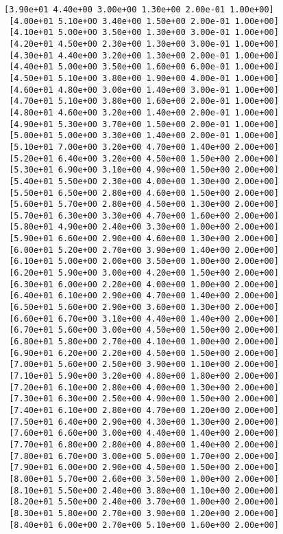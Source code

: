 \documentclass[11pt]{article}
\begin{document}
\begin{Verbatim}[commandchars=\\\{\}]
 [3.90e+01 4.40e+00 3.00e+00 1.30e+00 2.00e-01 1.00e+00]
 [4.00e+01 5.10e+00 3.40e+00 1.50e+00 2.00e-01 1.00e+00]
 [4.10e+01 5.00e+00 3.50e+00 1.30e+00 3.00e-01 1.00e+00]
 [4.20e+01 4.50e+00 2.30e+00 1.30e+00 3.00e-01 1.00e+00]
 [4.30e+01 4.40e+00 3.20e+00 1.30e+00 2.00e-01 1.00e+00]
 [4.40e+01 5.00e+00 3.50e+00 1.60e+00 6.00e-01 1.00e+00]
 [4.50e+01 5.10e+00 3.80e+00 1.90e+00 4.00e-01 1.00e+00]
 [4.60e+01 4.80e+00 3.00e+00 1.40e+00 3.00e-01 1.00e+00]
 [4.70e+01 5.10e+00 3.80e+00 1.60e+00 2.00e-01 1.00e+00]
 [4.80e+01 4.60e+00 3.20e+00 1.40e+00 2.00e-01 1.00e+00]
 [4.90e+01 5.30e+00 3.70e+00 1.50e+00 2.00e-01 1.00e+00]
 [5.00e+01 5.00e+00 3.30e+00 1.40e+00 2.00e-01 1.00e+00]
 [5.10e+01 7.00e+00 3.20e+00 4.70e+00 1.40e+00 2.00e+00]
 [5.20e+01 6.40e+00 3.20e+00 4.50e+00 1.50e+00 2.00e+00]
 [5.30e+01 6.90e+00 3.10e+00 4.90e+00 1.50e+00 2.00e+00]
 [5.40e+01 5.50e+00 2.30e+00 4.00e+00 1.30e+00 2.00e+00]
 [5.50e+01 6.50e+00 2.80e+00 4.60e+00 1.50e+00 2.00e+00]
 [5.60e+01 5.70e+00 2.80e+00 4.50e+00 1.30e+00 2.00e+00]
 [5.70e+01 6.30e+00 3.30e+00 4.70e+00 1.60e+00 2.00e+00]
 [5.80e+01 4.90e+00 2.40e+00 3.30e+00 1.00e+00 2.00e+00]
 [5.90e+01 6.60e+00 2.90e+00 4.60e+00 1.30e+00 2.00e+00]
 [6.00e+01 5.20e+00 2.70e+00 3.90e+00 1.40e+00 2.00e+00]
 [6.10e+01 5.00e+00 2.00e+00 3.50e+00 1.00e+00 2.00e+00]
 [6.20e+01 5.90e+00 3.00e+00 4.20e+00 1.50e+00 2.00e+00]
 [6.30e+01 6.00e+00 2.20e+00 4.00e+00 1.00e+00 2.00e+00]
 [6.40e+01 6.10e+00 2.90e+00 4.70e+00 1.40e+00 2.00e+00]
 [6.50e+01 5.60e+00 2.90e+00 3.60e+00 1.30e+00 2.00e+00]
 [6.60e+01 6.70e+00 3.10e+00 4.40e+00 1.40e+00 2.00e+00]
 [6.70e+01 5.60e+00 3.00e+00 4.50e+00 1.50e+00 2.00e+00]
 [6.80e+01 5.80e+00 2.70e+00 4.10e+00 1.00e+00 2.00e+00]
 [6.90e+01 6.20e+00 2.20e+00 4.50e+00 1.50e+00 2.00e+00]
 [7.00e+01 5.60e+00 2.50e+00 3.90e+00 1.10e+00 2.00e+00]
 [7.10e+01 5.90e+00 3.20e+00 4.80e+00 1.80e+00 2.00e+00]
 [7.20e+01 6.10e+00 2.80e+00 4.00e+00 1.30e+00 2.00e+00]
 [7.30e+01 6.30e+00 2.50e+00 4.90e+00 1.50e+00 2.00e+00]
 [7.40e+01 6.10e+00 2.80e+00 4.70e+00 1.20e+00 2.00e+00]
 [7.50e+01 6.40e+00 2.90e+00 4.30e+00 1.30e+00 2.00e+00]
 [7.60e+01 6.60e+00 3.00e+00 4.40e+00 1.40e+00 2.00e+00]
 [7.70e+01 6.80e+00 2.80e+00 4.80e+00 1.40e+00 2.00e+00]
 [7.80e+01 6.70e+00 3.00e+00 5.00e+00 1.70e+00 2.00e+00]
 [7.90e+01 6.00e+00 2.90e+00 4.50e+00 1.50e+00 2.00e+00]
 [8.00e+01 5.70e+00 2.60e+00 3.50e+00 1.00e+00 2.00e+00]
 [8.10e+01 5.50e+00 2.40e+00 3.80e+00 1.10e+00 2.00e+00]
 [8.20e+01 5.50e+00 2.40e+00 3.70e+00 1.00e+00 2.00e+00]
 [8.30e+01 5.80e+00 2.70e+00 3.90e+00 1.20e+00 2.00e+00]
 [8.40e+01 6.00e+00 2.70e+00 5.10e+00 1.60e+00 2.00e+00]

\end{Verbatim}
\end{document}
